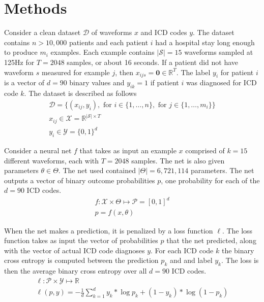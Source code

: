 \section{Methods}

Consider a clean dataset $\mathcal{D}$ of waveforms $x$ and ICD codes $y$.  The dataset contains $n > 10,000$ patients and each patient $i$ had a hospital stay long enough to produce $m_i$ examples.  Each example contains $|\mathcal{S}|=15$ waveforms sampled at 125Hz for $T = 2048$ samples, or about 16 seconds.  If a patient did not have waveform $s$ measured for example $j$, then $x_{ijs} = \mathbf{0} \in \mathbb{R}^T$.  The label $y_i$ for patient $i$ is a vector of $d=90$ binary values and $y_{ik} = 1$ if patient $i$ was diagnosed for ICD code $k$.  The dataset is described as follows
\begin{gather}
    \mathcal{D} = \{
        (x_{ij}, y_i),
        \text{ for } i \in \{ 1, \dots, n \},
        \text{ for } j \in \{ 1, \dots, m_i \}
    \} \\
    x_{ij} \in \mathcal{X} = \mathbb{R}^{|\mathcal{S}| \times T} \\
    y_i \in \mathcal{Y} = \{0, 1\}^d
\end{gather}

Consider a neural net $f$ that takes as input an example $x$ comprised of $k=15$ different waveforms, each with $T=2048$ samples.  The net is also given parameters $\theta \in \Theta$.  The net used contained $|\Theta| = 6,721,114$ parameters.  The net outputs a vector of binary outcome probabilities $p$, one probability for each of the $d=90$ ICD codes.
\begin{gather}
    f: \mathcal{X} \times \Theta \mapsto \mathcal{P} = [0, 1]^d \\
    p = f(x, \theta)
\end{gather}

When the net makes a prediction, it is penalized by a loss function $\ell$.  The loss function takes as input the vector of probabilities $p$ that the net predicted, along with the vector of actual ICD code diagnoses $y$.  For each ICD code $k$ the binary cross entropy is computed between the prediction $p_k$ and and label $y_k$.  The loss is then the average binary cross entropy over all $d=90$ ICD codes.
\begin{gather}
    \ell: \mathcal{P} \times \mathcal{Y} \mapsto \mathbb{R} \\
    \ell(p, y) = -\frac{1}{d} \sum_{k=1}^d 
        y_k * \log p_k + (1 - y_k) * \log(1 - p_k)
\end{gather}

